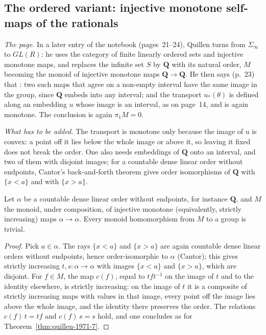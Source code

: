 \subsection{The ordered variant: injective monotone self-maps of the rationals}\label{sec:quillen-1971-7-ord}

\emph{The page.} In a later entry of the notebook (pages~21--24), Quillen turns from $\Sigma_\infty$ to $GL(R)$: he uses the category of finite linearly ordered sets and injective monotone maps, and replaces the infinite set $S$ by $\mathbf Q$ with its natural order, $M$ becoming the monoid of injective monotone maps $\mathbf Q \to \mathbf Q$. He then says (p.~23) that : two such maps that agree on a non-empty interval have the same image in the group, since $\mathbf Q$ embeds into any interval; and the transport $u_*(\theta)$ is defined along an embedding $u$ whose image is an interval, as on page~14, and is again monotone. The conclusion is again $\pi_1 M = 0$.

\emph{What has to be added.} The transport is monotone only because the image of $u$ is convex: a point off it lies below the whole image or above it, so leaving it fixed does not break the order. One also needs embeddings of $\mathbf Q$ onto an interval, and two of them with disjoint images; for a countable dense linear order without endpoints, Cantor's back-and-forth theorem gives order isomorphisms of $\mathbf Q$ with $\{x < a\}$ and with $\{x > a\}$.

\begin{encadre}
\begin{theoreme}\label{thm:quillen-1971-7-ord}
Let $\alpha$ be a countable dense linear order without endpoints, for instance $\mathbf Q$, and $M$ the monoid, under composition, of injective monotone (equivalently, strictly increasing) maps $\alpha \to \alpha$. Every monoid homomorphism from $M$ to a group is trivial.
\end{theoreme}
\end{encadre}

\begin{proof}
Pick $a \in \alpha$. The rays $\{x < a\}$ and $\{x > a\}$ are again countable dense linear orders without endpoints, hence order-isomorphic to $\alpha$ (Cantor); this gives strictly increasing $t, s : \alpha \to \alpha$ with images $\{x < a\}$ and $\{x > a\}$, which are disjoint. For $f \in M$, the map $c(f)$, equal to $t f t^{-1}$ on the image of $t$ and to the identity elsewhere, is strictly increasing: on the image of $t$ it is a composite of strictly increasing maps with values in that image, every point off the image lies above the whole image, and the identity there preserves the order. The relations $c(f)\, t = t f$ and $c(f)\, s = s$ hold, and one concludes as for Theorem~\ref{thm:quillen-1971-7}.
\end{proof}

